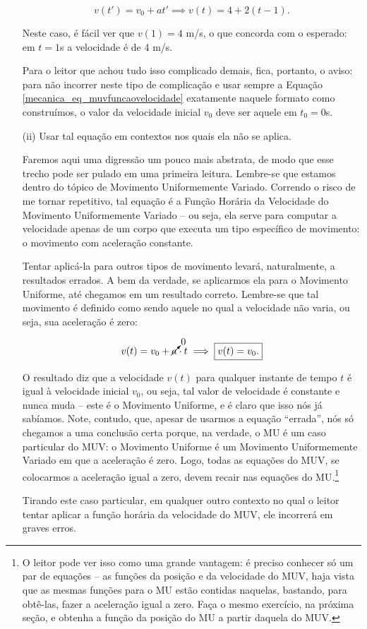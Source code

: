 \begin{itemize}
     $$ v(t') = v_0 + at' \implies v(t)= 4 + 2(t-1).$$
     
     Neste caso, é fácil ver que $v(1) = 4$ m/s, o que concorda com o esperado: em $t=1$s a velocidade é de 4 m/s. 
     
     
     Para o leitor que achou tudo isso complicado demais, fica, portanto, o aviso: para não incorrer neste tipo de complicação e usar sempre a Equação \eqref{mecanica_eq_muvfuncaovelocidade} exatamente naquele formato como construímos, o valor da velocidade inicial $v_0$ deve ser aquele em $t_0=0$s.
     
    \item [(ii)]
     Usar tal equação em contextos nos quais ela não se aplica.

     Faremos aqui uma digressão um pouco mais abstrata, de modo que esse trecho pode ser pulado em uma primeira leitura. Lembre-se que estamos dentro do tópico de Movimento Uniformemente Variado. Correndo o risco de me tornar repetitivo, tal equação é a Função Horária da Velocidade do Movimento Uniformemente Variado -- ou seja, ela serve para computar a velocidade apenas de um corpo que executa um tipo específico de movimento: o movimento com aceleração constante.

     Tentar aplicá-la para outros tipos de movimento levará, naturalmente, a resultados errados. A bem da verdade, se aplicarmos ela para o Movimento Uniforme, até chegamos em um resultado correto. Lembre-se que tal movimento é definido como sendo aquele no qual a velocidade não varia, ou seja, sua aceleração é zero:

     $$ v(t) = v_0 + \cancelto{0}{a} \cdot t \implies \boxed{v(t)=v_0.}$$

     O resultado diz que a velocidade $v(t)$ para qualquer instante de tempo $t$ é igual à velocidade inicial $v_0$, ou seja, tal valor de velocidade é constante e nunca muda -- este é o Movimento Uniforme, e é claro que isso nós já sabíamos. Note, contudo, que, apesar de usarmos a equação ``errada'', nós só chegamos a uma conclusão certa porque, na verdade, o MU é um caso particular do MUV: o Movimento Uniforme é um Movimento Uniformemente Variado em que a aceleração é zero. Logo, todas as equações do MUV, se colocarmos a aceleração igual a zero, devem recair nas equações do MU.\footnote{O leitor pode ver isso como uma grande vantagem: é preciso conhecer só um par de equações -- as funções da posição e da velocidade do MUV, haja vista que as mesmas funções para o MU estão contidas naquelas, bastando, para obtê-las, fazer a aceleração igual a zero. Faça o mesmo exercício, na próxima seção, e obtenha a função da posição do MU a partir daquela do MUV.}

     Tirando este caso particular, em qualquer outro contexto no qual o leitor tentar aplicar a função horária da velocidade do MUV, ele incorrerá em graves erros.
    
    
\end{itemize}


